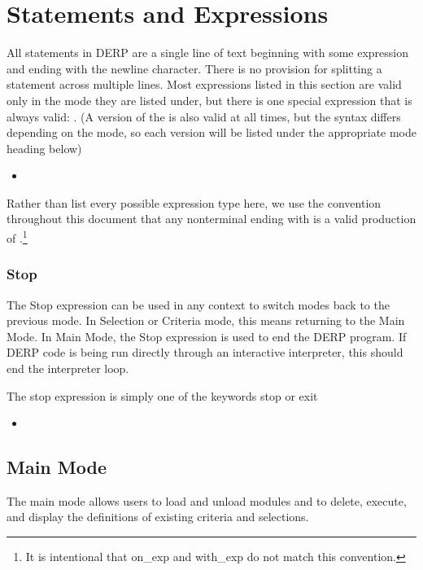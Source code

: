 \section{Statements and Expressions}
All statements in DERP are a single line of text beginning with some expression
and ending with the newline character. There is no provision for splitting a
statement across multiple lines. Most expressions listed in this section are
valid only in the mode they are listed under, but there is one special expression
that is always valid: . (A version of the 
is also valid at all times, but the syntax differs depending on the mode, so each version
will be listed under the appropriate mode heading below)
\begin{itemize}[leftmargin=2in]
    \item[\nonterminal{statement}] \bnf{:}  
\end{itemize}


Rather than list every possible expression type here, we use the convention throughout
this document that any nonterminal ending with  is a valid production of
.\footnote{It is intentional that on\_exp and with\_exp do not match this convention.}

\subsubsection{Stop}
The Stop expression can be used in any context to switch modes back to the previous mode. In Selection
or Criteria mode, this means returning to the Main Mode. In Main Mode, the Stop expression is used to
end the DERP program. If DERP code is being run directly through an interactive interpreter, this should
end the interpreter loop.

The stop expression is simply one of the keywords stop or exit
\begin{itemize}[leftmargin=2in]
    \item[\nonterminal{stop\_expression}] \bnf{:}  \bnf{|} 
\end{itemize}

\subsection{Main Mode}
The main mode allows users to load and unload modules and to delete, execute, and display the definitions
of existing criteria and selections.

